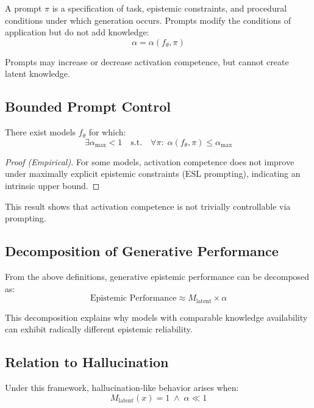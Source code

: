 \begin{definition}[Prompt]
A prompt $\pi$ is a specification of task, epistemic constraints, and procedural conditions under which generation occurs. Prompts modify the conditions of application but do not add knowledge:
\[
\alpha = \alpha(f_\theta, \pi)
\]
\end{definition}

Prompts may increase or decrease activation competence, but cannot create latent knowledge.


\subsection{Bounded Prompt Control}

\begin{theorem}
There exist models $f_\theta$ for which:
\[
\exists \alpha_{\max} < 1 \quad \text{s.t.} \quad \forall \pi:\; \alpha(f_\theta, \pi) \le \alpha_{\max}
\]
\end{theorem}

\begin{proof}[Proof (Empirical)]
For some models, activation competence does not improve under maximally explicit epistemic constraints (ESL prompting), indicating an intrinsic upper bound.
\end{proof}

This result shows that activation competence is not trivially controllable via prompting.


\subsection{Decomposition of Generative Performance}

From the above definitions, generative epistemic performance can be decomposed as:
\begin{equation}
\text{Epistemic Performance} \approx M_{\text{latent}} \times \alpha
\end{equation}

This decomposition explains why models with comparable knowledge availability can exhibit radically different epistemic reliability.


\subsection{Relation to Hallucination}

Under this framework, hallucination-like behavior arises when:
\[
M_{\text{latent}}(x) = 1 \;\land\; \alpha \ll 1
\]

